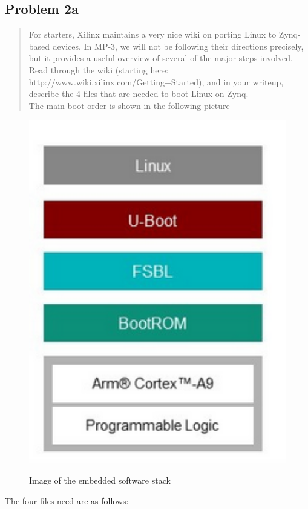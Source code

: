 \documentclass[10pt,a4paper]{article}
\let\oldsubsection\subsection
\renewcommand{\subsection}{%
    \setcounter{equation}{0}%
    \oldsubsection%
}
\begin{document}
\subsection{Problem 2a}\begin{quote}
For starters, Xilinx maintains a very nice wiki on porting Linux to Zynq-based devices. In MP-3, we will not be
following their directions precisely, but it provides a useful overview of several of the major steps involved. Read
through the wiki (starting here: http://www.wiki.xilinx.com/Getting+Started), and in your writeup, describe the
4 files that are needed to boot Linux on Zynq.\\


The main boot order is shown in the following picture
\end{quote}
\begin{figure}[H]
\centering
\includegraphics[width=5in]{images/Zynq SW Stack.PNG
} \\
\caption{Image of the embedded software stack\cite{xlinx}}
\end{figure}
The four files need are as follows\cite{logic}:\\
\end{document}
